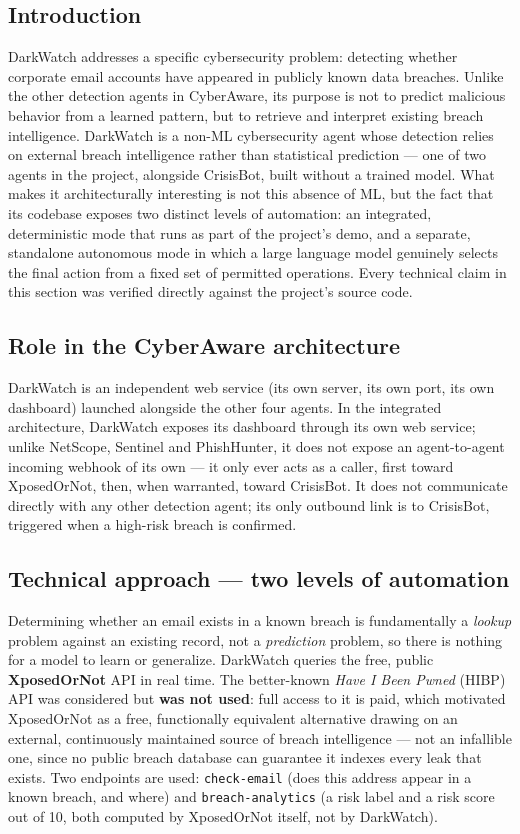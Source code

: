 \documentclass[12pt,a4paper]{report}
\newcommand{\ProjectName}{CyberAware}
\begin{document}
\subsection*{Introduction}
DarkWatch addresses a specific cybersecurity problem: detecting whether corporate email accounts have appeared in publicly known data breaches. Unlike the other detection agents in \ProjectName{}, its purpose is not to predict malicious behavior from a learned pattern, but to retrieve and interpret existing breach intelligence. DarkWatch is a non-ML cybersecurity agent whose detection relies on external breach intelligence rather than statistical prediction --- one of two agents in the project, alongside CrisisBot, built without a trained model. What makes it architecturally interesting is not this absence of ML, but the fact that its codebase exposes two distinct levels of automation: an integrated, deterministic mode that runs as part of the project's demo, and a separate, standalone autonomous mode in which a large language model genuinely selects the final action from a fixed set of permitted operations. Every technical claim in this section was verified directly against the project's source code.

\subsection*{Role in the \ProjectName{} architecture}
DarkWatch is an independent web service (its own server, its own port, its own dashboard) launched alongside the other four agents. In the integrated architecture, DarkWatch exposes its dashboard through its own web service; unlike NetScope, Sentinel and PhishHunter, it does not expose an agent-to-agent incoming webhook of its own --- it only ever acts as a caller, first toward XposedOrNot, then, when warranted, toward CrisisBot. It does not communicate directly with any other detection agent; its only outbound link is to CrisisBot, triggered when a high-risk breach is confirmed.

\subsection*{Technical approach --- two levels of automation}
Determining whether an email exists in a known breach is fundamentally a \emph{lookup} problem against an existing record, not a \emph{prediction} problem, so there is nothing for a model to learn or generalize. DarkWatch queries the free, public \textbf{XposedOrNot} API in real time. The better-known \emph{Have I Been Pwned} (HIBP) API was considered but \textbf{was not used}: full access to it is paid, which motivated XposedOrNot as a free, functionally equivalent alternative drawing on an external, continuously maintained source of breach intelligence --- not an infallible one, since no public breach database can guarantee it indexes every leak that exists. Two endpoints are used: \texttt{check-email} (does this address appear in a known breach, and where) and \texttt{breach-analytics} (a risk label and a risk score out of 10, both computed by XposedOrNot itself, not by DarkWatch).
\end{document}
